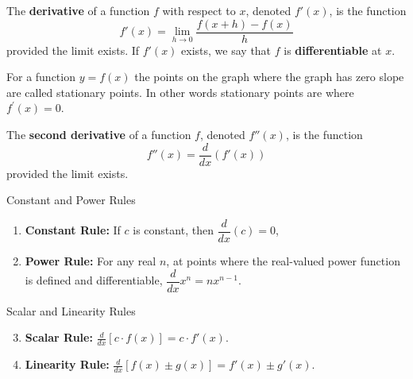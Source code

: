 \begin{definition}
The \textbf{derivative} of a function \( f \) with respect to \( x \), denoted \( f'(x) \), is the function
\[
f'(x) = \lim_{h \to 0} \frac{f(x+h) - f(x)}{h}
\]
provided the limit exists. If \( f'(x) \) exists, we say that \( f \) is \textbf{differentiable} at \( x \).
\end{definition}

\begin{definition}
     For a function $y=f(x)$ the points on the graph where the graph has zero slope are called stationary points. In other words stationary points are where $f^{\prime}(x)=0$.
    \end{definition}

\begin{definition}
The \textbf{second derivative} of a function \( f \), denoted \( f''(x) \), is the function
\[
f''(x) = \frac{d}{dx} \left( f'(x) \right)
\]
provided the limit exists.
\end{definition}

\begin{theorem}{Constant and Power Rules}
    \begin{enumerate}
        \item \textbf{Constant Rule:} If $c$ is constant, then $\dfrac{d}{dx}(c) = 0$, \vspace{0.5em}
        \item \textbf{Power Rule:} For any real $n$, at points where the real-valued power function is defined and differentiable, $\dfrac{d}{dx}x^n = n x^{n - 1}$. \vspace{0.5em}
    \end{enumerate}
\end{theorem}

\begin{theorem}{Scalar and Linearity Rules}
    \begin{enumerate}
        \setcounter{enumi}{2}
        \vspace{0.5em}
        \item \textbf{Scalar Rule:} \( \frac{d}{dx}[c \cdot f(x)] = c \cdot f'(x) \). \vspace{0.5em}
        \item \textbf{Linearity Rule:} \( \frac{d}{dx}[f(x) \pm g(x)] = f'(x) \pm g'(x) \). \vspace{0.5em}
    \end{enumerate}
\end{theorem}

